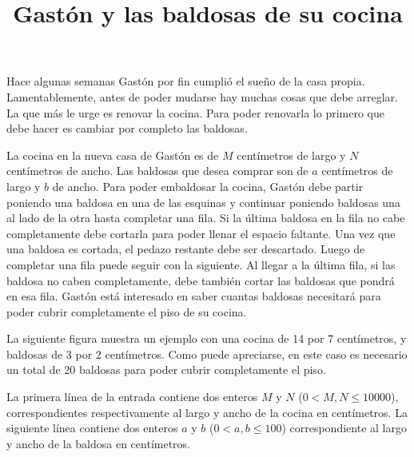 \documentclass{oci}
\title{Gastón y las baldosas de su cocina}
\begin{document}
\begin{problemDescription}
  Hace algunas semanas Gastón por fin cumplió el sueño de la casa propia.
  Lamentablemente, antes de poder mudarse hay muchas cosas que debe arreglar.
  La que más le urge es renovar la cocina.
  Para poder renovarla lo primero que debe hacer es cambiar por completo las
  baldosas.

  La cocina en la nueva casa de Gastón es de $M$ centímetros de largo y $N$
  centímetros de ancho.
  Las baldosas que desea comprar son de $a$ centímetros de largo y $b$ de ancho.
  Para poder embaldosar la cocina, Gastón debe partir poniendo una baldosa en una
  de las esquinas y continuar poniendo baldosas una al lado de la otra hasta
  completar una fila.
  Si la última baldosa en la fila no cabe completamente debe cortarla para
  poder llenar el espacio faltante.
  Una vez que una baldosa es cortada, el pedazo restante debe ser descartado.
  Luego de completar una fila puede seguir con la siguiente.
  Al llegar a la última fila, si las baldosa no caben completamente, debe
  también cortar las baldosas que pondrá en esa fila.
  Gastón está interesado en saber cuantas baldosas necesitará para poder cubrir
  completamente el piso de su cocina.

  La siguiente figura muestra un ejemplo con una cocina de 14 por 7 centímetros,
  y baldosas de 3 por 2 centímetros.
  Como puede apreciarse, en este caso es necesario un total de 20 baldosas para
  poder cubrir completamente el piso.
  \begin{center}
  \end{center}
\end{problemDescription}

\begin{inputDescription}
  La primera línea de la entrada contiene dos enteros $M$ y $N$ ($0 < M, N \leq
  10000$), correspondientes respectivamente al largo y ancho de la cocina en
  centímetros.
  La siguiente línea contiene dos enteros $a$ y $b$ ($0 < a, b \leq 100$)
  correspondiente al largo y ancho de la baldosa en centímetros.
\end{inputDescription}
\end{document}
